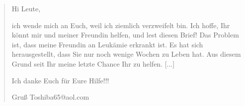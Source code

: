 \begin{frame}
\begin{quotation}
Hi Leute,

ich wende mich an Euch, weil ich ziemlich verzweifelt bin. Ich hoffe, Ihr könnt mir und meiner Freundin helfen, und lest diesen Brief! Das Problem ist, dass meine Freundin an Leukämie erkrankt ist. Es hat sich herausgestellt, dass Sie nur noch wenige Wochen zu Leben hat. Aus diesem Grund seit Ihr meine letzte Chance Ihr zu helfen. 
[...]

Ich danke Euch für Eure Hilfe!!!

Gruß Toshiba65@aol.com
\end{quotation}
\end{frame}


\begin{frame}
\begin{figure}[ht]
	\centering
\end{figure}
\end{frame}

